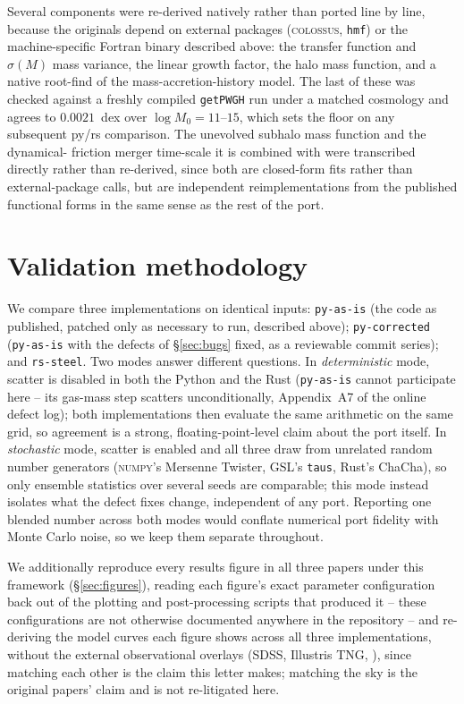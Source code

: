 \documentclass[fleqn,usenatbib]{mnras}
\begin{document}
Several components were re-derived natively rather than ported line by
line, because the originals depend on external packages
(\textsc{colossus}, \texttt{hmf}) or the machine-specific Fortran binary
described above: the \citet{EisensteinHu1998} transfer function and
$\sigma(M)$ mass variance, the linear growth factor, the
\citet{Despali2016} halo mass function, and a native root-find of the
\citet{vandenBosch2014} mass-accretion-history model. The last of these
was checked against a freshly compiled \texttt{getPWGH} run under a
matched cosmology and agrees to $0.0021$~dex over $\log M_0 = 11$--$15$,
which sets the floor on any subsequent py/rs comparison. The unevolved
subhalo mass function \citep{JiangVandenBosch2016} and the dynamical-
friction merger time-scale it is combined with \citep{BoylanKolchin2008,
McCavana2012} were transcribed directly rather than re-derived, since
both are closed-form fits rather than external-package calls, but are
independent reimplementations from the published functional forms in
the same sense as the rest of the port.

\section{Validation methodology}
\label{sec:method}

We compare three implementations on identical inputs: \texttt{py-as-is}
(the code as published, patched only as necessary to run, described
above); \texttt{py-corrected} (\texttt{py-as-is} with the defects of
\S\ref{sec:bugs} fixed, as a reviewable commit series); and
\texttt{rs-steel}. Two modes answer different questions. In
\emph{deterministic} mode, scatter is disabled in both the Python and the
Rust (\texttt{py-as-is} cannot participate here -- its gas-mass step
scatters unconditionally, Appendix~A7 of the online defect log); both
implementations then evaluate the same arithmetic on the same grid, so
agreement is a strong, floating-point-level claim about the port itself.
In \emph{stochastic} mode, scatter is enabled and all three draw from
unrelated random number generators (\textsc{numpy}'s Mersenne Twister,
GSL's \texttt{taus}, Rust's ChaCha), so only ensemble statistics over
several seeds are comparable; this mode instead isolates what the defect
fixes change, independent of any port. Reporting one blended number
across both modes would conflate numerical port fidelity with
Monte Carlo noise, so we keep them separate throughout.

We additionally reproduce every results figure in all three papers under
this framework (\S\ref{sec:figures}), reading each figure's exact
parameter configuration back out of the plotting and post-processing
scripts that produced it -- these configurations are not otherwise
documented anywhere in the repository -- and re-deriving the model curves
each figure shows across all three implementations, without the
external observational overlays (SDSS, Illustris TNG, \citealt{Mundy2017}),
since matching each other is the claim this letter makes; matching the
sky is the original papers' claim and is not re-litigated here.
\end{document}
